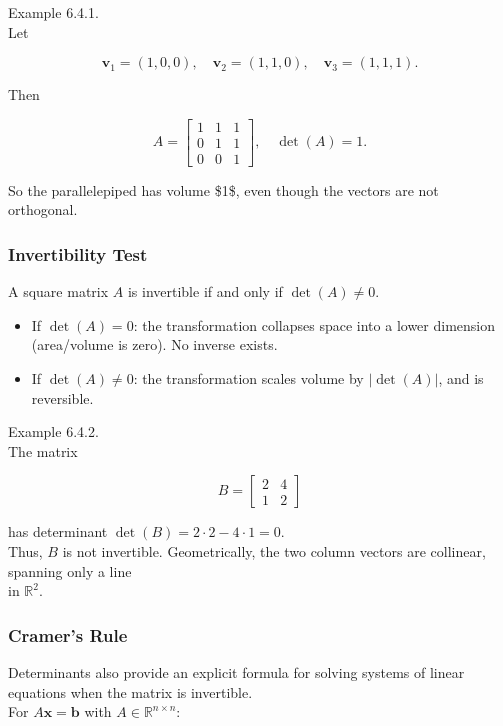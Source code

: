 \documentclass[
  12pt,
  a4paper,
]{article}
\begin{document}
Example 6.4.1.\\
Let

\[\mathbf{v}_1 = (1,0,0), \quad \mathbf{v}_2 = (1,1,0), \quad \mathbf{v}_3 = (1,1,1).\]

Then

\[A = \begin{bmatrix}
1 & 1 & 1 \\
0 & 1 & 1 \\
0 & 0 & 1
\end{bmatrix}, \quad \det(A) = 1.\]

So the parallelepiped has volume \$1\$, even though the vectors are not
orthogonal.

\subsubsection{Invertibility Test}\label{invertibility-test}

A square matrix \(A\) is invertible if and only if \(\det(A) \neq 0\).

\begin{itemize}
\item
  If \(\det(A) = 0\): the transformation collapses space into a lower
  dimension (area/volume is zero). No inverse exists.
\item
  If \(\det(A) \neq 0\): the transformation scales volume by
  \(|\det(A)|\), and is reversible.
\end{itemize}

Example 6.4.2.\\
The matrix

\[B = \begin{bmatrix} 2 & 4 \\ 1 & 2 \end{bmatrix}\]

has determinant \(\det(B) = 2 \cdot 2 - 4 \cdot 1 = 0\).\\
Thus, \(B\) is not invertible. Geometrically, the two column vectors are
collinear, spanning only a line\\
in \(\mathbb{R}^2\).

\subsubsection{Cramer's Rule}\label{cramers-rule}

Determinants also provide an explicit formula for solving systems of
linear equations when the matrix is invertible.\\
For \(A\mathbf{x} = \mathbf{b}\) with \(A \in \mathbb{R}^{n \times n}\):
\end{document}
